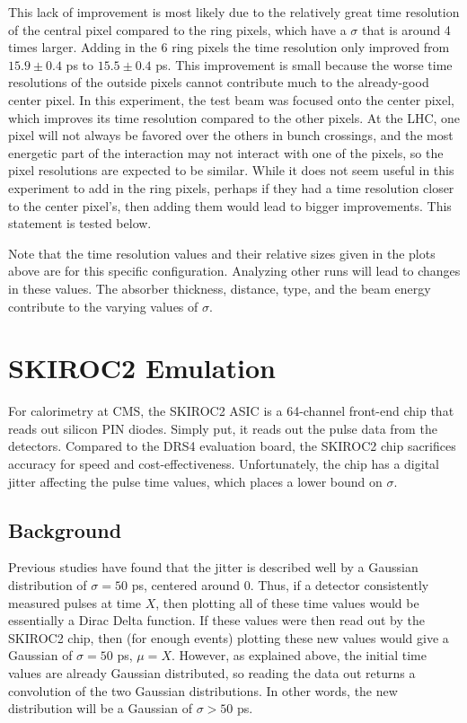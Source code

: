 \documentclass[twocolumn,aps,prd,reprint,superscriptaddress,floatfix]{revtex4-1}
\begin{document}
This lack of improvement is most likely due to the relatively great time resolution of the central pixel compared to the ring pixels, which have a $\sigma$ that is around 4 times larger. 
Adding in the 6 ring pixels the time resolution only improved from $15.9 \pm 0.4$ ps to $15.5 \pm 0.4$ ps.
This improvement is small because the worse time resolutions of the outside pixels cannot contribute much to the already-good center pixel.
In this experiment, the test beam was focused onto the center pixel, which improves its time resolution compared to the other pixels. 
At the LHC, one pixel will not always be favored over the others in bunch crossings, and the most energetic part of the interaction may not interact with one of the pixels, so the pixel resolutions are expected to be similar.
While it does not seem useful in this experiment to add in the ring pixels, perhaps if they had a time resolution closer to the center pixel's, then adding them would lead to bigger improvements.
This statement is tested below.

Note that the time resolution values and their relative sizes given in the plots above are for this specific configuration.
Analyzing other runs will lead to changes in these values. 
The absorber thickness, distance, type, and the beam energy contribute to the varying values of $\sigma$.

\section{SKIROC2 Emulation}
For calorimetry at CMS, the SKIROC2 ASIC is a 64-channel front-end chip that reads out silicon PIN diodes.
Simply put, it reads out the pulse data from the detectors.
Compared to the DRS4 evaluation board, the SKIROC2 chip sacrifices accuracy for speed and cost-effectiveness.
Unfortunately, the chip has a digital jitter affecting the pulse time values, which places a lower bound on $\sigma$. 

\subsection{Background}
Previous studies have found that the jitter is described well by a Gaussian distribution of $\sigma=50$ ps, centered around 0.
Thus, if a detector consistently measured pulses at time $X$, then plotting all of these time values would be essentially a Dirac Delta function.
If these values were then read out by the SKIROC2 chip, then (for enough events) plotting these new values would give a Gaussian of $\sigma = 50$ ps, $\mu = X$.
However, as explained above, the initial time values are already Gaussian distributed, so reading the data out returns a convolution of the two Gaussian distributions. 
In other words, the new distribution will be a Gaussian of $\sigma > 50$ ps.
\end{document}
